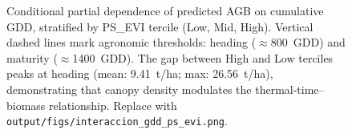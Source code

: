 \documentclass[lettersize,journal]{IEEEtran}
\begin{document}
\begin{figure}[!t]
\centering
\fbox{\rule{0pt}{2.5in}\rule{3.0in}{0pt}}
\caption{Conditional partial dependence of predicted AGB on cumulative GDD,
stratified by PS\_EVI tercile (Low, Mid, High). Vertical dashed lines mark
agronomic thresholds: heading ($\approx$800~GDD) and maturity
($\approx$1400~GDD). The gap between High and Low terciles peaks at heading
(mean: 9.41~t/ha; max: 26.56~t/ha), demonstrating that canopy density
modulates the thermal-time--biomass relationship. Replace with
\texttt{output/figs/interaccion\_gdd\_ps\_evi.png}.}
\label{fig:pdp}
\end{figure}

\vfill
\end{document}
